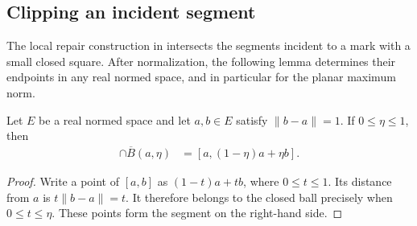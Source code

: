 \subsection{Clipping an incident segment}
\label{subsec:area_law_segment_clipping}

The local repair construction in \cite[Section~11]{OpenAI2026AreaLaw}
intersects the segments incident to a mark with a small closed square.
After normalization, the following lemma determines their endpoints in
any real normed space, and in particular for the planar maximum norm.

\begin{lemma}
    \label{thm:area_law_unit_segment_ball_clipping}
    \leanok
    Let $E$ be a real normed space and let $a,b\in E$ satisfy
    $\|b-a\|=1$. If $0\le\eta\le1$, then
    \begin{align}
        [a,b]\cap\overline B(a,\eta)
         & = [a,(1-\eta)a+\eta b].
    \end{align}
\end{lemma}
\begin{proof}\leanok
    Write a point of $[a,b]$ as $(1-t)a+tb$, where $0\le t\le1$.
    Its distance from $a$ is $t\|b-a\|=t$. It therefore belongs to
    the closed ball precisely when $0\le t\le\eta$.
    These points form the segment on the right-hand side.
\end{proof}
